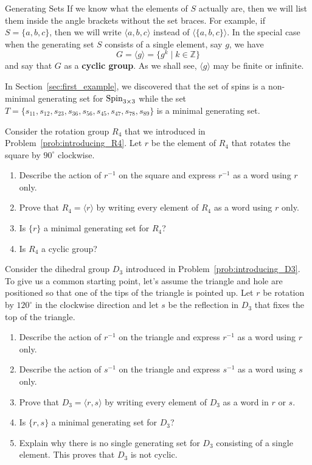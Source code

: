 \begin{section}{Generating Sets}
If we know what the elements of $S$ actually are, then we will list them inside the angle brackets without the set braces.  For example, if $S=\{a,b,c\}$, then we will write $\langle a, b, c\rangle$ instead of $\langle \{a,b,c\}\rangle$. In the special case when the generating set $S$ consists of a single element, say $g$, we have
\[
G=\langle g\rangle =\{g^k\mid k\in\mathbb{Z}\}
\]
and say that $G$ as a \textbf{cyclic group}.  As we shall see, $\langle g\rangle$ may be finite or infinite. 

\begin{example}
In Section~\ref{sec:first_example}, we discovered that the set of spins is a non-minimal generating set for $\operatorname{Spin}_{3\times 3}$ while the set $T=\{s_{11}, s_{12}, s_{23}, s_{36}, s_{56}, s_{45}, s_{47}, s_{78}, s_{89}\}$ is a minimal generating set.
\end{example}

\begin{problem}
Consider the rotation group $R_4$ that we introduced in Problem~\ref{prob:introducing_R4}. Let $r$ be the element of $R_4$ that rotates the square by $90^\circ$ clockwise. 
\begin{enumerate}[label=\rm{(\alph*)}]
\item Describe the action of $r^{-1}$ on the square and express $r^{-1}$ as a word using $r$ only.
\item Prove that $R_4=\langle r\rangle$ by writing every element of $R_4$ as a word using $r$ only.
\item Is $\{r\}$ a minimal generating set for $R_4$?
\item Is $R_4$ a cyclic group?
\end{enumerate}
\end{problem}

\begin{problem}\label{prob:revisiting_D3}
Consider the dihedral group $D_3$ introduced in Problem~\ref{prob:introducing_D3}. To give us a common starting point, let's assume the triangle and hole are positioned so that one of the tips of the triangle is pointed up. Let $r$ be rotation by $120^\circ$ in the clockwise direction and let $s$ be the reflection in $D_3$ that fixes the top of the triangle.
\begin{enumerate}[label=\rm{(\alph*)}]
\item Describe the action of $r^{-1}$ on the triangle and express $r^{-1}$ as a word using $r$ only.
\item Describe the action of $s^{-1}$ on the triangle and express $s^{-1}$ as a word using $s$ only.
\item Prove that $D_3=\langle r,s\rangle$ by writing every element of $D_3$ as a word in $r$ or $s$.
\item Is $\{r,s\}$ a minimal generating set for $D_3$?
\item Explain why there is no single generating set for $D_3$ consisting of a single element. This proves that $D_3$ is not cyclic.
\end{enumerate}
\end{problem}


\end{section}
